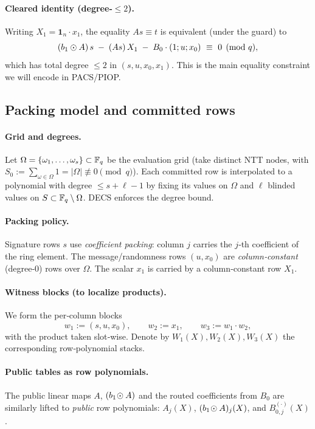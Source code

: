 \paragraph{Cleared identity (degree‑$\le 2$).}
Writing $X_1=\mathbf 1_n\!\cdot x_1$, the equality $A s \equiv t$ is equivalent (under the guard) to
\begin{equation}\label{eq:cleared-bbs-merged}
  (b_1\odot A)\,s \;-\; (A s)\,X_1 \;-\; B_0\cdot(1;u;x_0)\ \equiv\ 0 \pmod q,
\end{equation}
which has total degree $\le 2$ in $(s,u,x_0,x_1)$. This is the main equality constraint we will encode in PACS/PIOP.

\subsection{Packing model and committed rows}
\label{subsec:merge-packing}


\paragraph{Grid and degrees.}
Let $\Omega=\{\omega_1,\dots,\omega_s\}\subset\mathbb{F}_q$ be the evaluation grid (take distinct NTT nodes, with $S_0:=\sum_{\omega\in\Omega}1=|\Omega|\not\equiv 0\pmod q$). Each committed row is interpolated to a polynomial with degree $\le s+\ell-1$ by fixing its values on $\Omega$ and $\ell$ blinded values on $S\subset\mathbb{F}_q\setminus\Omega$. DECS enforces the degree bound.

\paragraph{Packing policy.}
Signature rows $s$ use \emph{coefficient packing}: column $j$ carries the $j$‑th coefficient of the ring element. The message/randomness rows $(u,x_0)$ are \emph{column‑constant} (degree‑0) rows over $\Omega$. The scalar $x_1$ is carried by a column‑constant row $X_1$.

\paragraph{Witness blocks (to localize products).}
We form the per‑column blocks
\[
  w_1 := (s,u,x_0), \qquad w_2 := x_1, \qquad w_3 := w_1\cdot w_2,
\]
with the product taken slot‑wise. Denote by $W_1(X),W_2(X),W_3(X)$ the corresponding row‑polynomial stacks.

\paragraph{Public tables as row polynomials.}
The public linear maps $A$, $(b_1\!\odot A)$ and the routed coefficients from $B_0$ are similarly lifted to \emph{public} row polynomials: $A_j(X)$, $(b_1\!\odot A)_j(X)$, and $B_{0,j}^{(\cdot)}(X)$.

